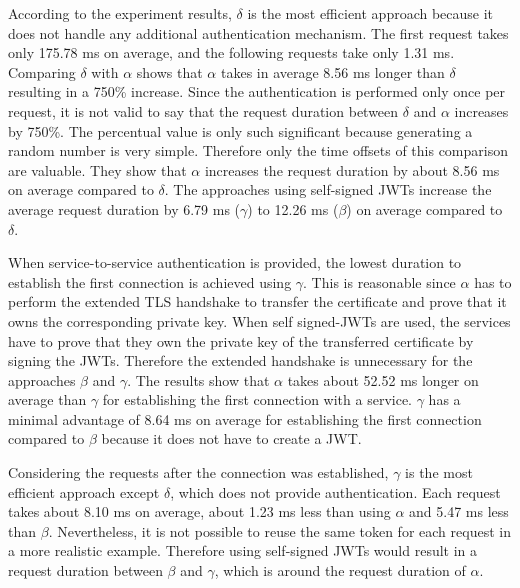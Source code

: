 According to the experiment results, $\delta$ is the most efficient approach because it does not handle any additional authentication mechanism.
The first request takes only 175.78 ms on average, and the following requests take only 1.31 ms.
Comparing $\delta$ with $\alpha$ shows that $\alpha$ takes in average 8.56 ms longer than $\delta$ resulting in a 750\% increase.
Since the authentication is performed only once per request, it is not valid to say that the request duration between $\delta$ and $\alpha$ increases by 750\%.
The percentual value is only such significant because generating a random number is very simple.
Therefore only the time offsets of this comparison are valuable.
They show that $\alpha$ increases the request duration by about 8.56 ms on average compared to $\delta$.
The approaches using self-signed JWTs increase the average request duration by 6.79 ms ($\gamma$) to 12.26 ms ($\beta$) on average compared to $\delta$. 

When service-to-service authentication is provided, the lowest duration to establish the first connection is achieved using $\gamma$.
This is reasonable since $\alpha$ has to perform the extended TLS handshake to transfer the certificate and prove that it owns the corresponding private key.
When self signed-JWTs are used, the services have to prove that they own the private key of the transferred certificate by signing the JWTs.
Therefore the extended handshake is unnecessary for the approaches $\beta$ and $\gamma$.
The results show that $\alpha$ takes about 52.52 ms longer on average than $\gamma$ for establishing the first connection with a service.
$\gamma$ has a minimal advantage of 8.64 ms on average for establishing the first connection compared to $\beta$ because it does not have to create a JWT.

Considering the requests after the connection was established, $\gamma$ is the most efficient approach except $\delta$, which does not provide authentication.
Each request takes about 8.10 ms on average, about 1.23 ms less than using $\alpha$ and 5.47 ms less than $\beta$.
Nevertheless, it is not possible to reuse the same token for each request in a more realistic example.
Therefore using self-signed JWTs would result in a request duration between $\beta$ and $\gamma$, which is around the request duration of $\alpha$.

